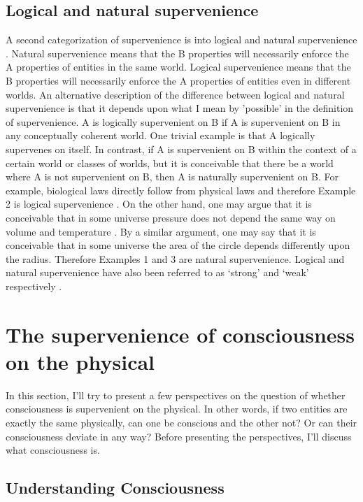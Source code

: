 \documentclass{article}
\begin{document}
\subsection*{Logical and natural supervenience}

A second categorization of supervenience is into logical and natural supervenience \cite{chalmers1996conscious}. Natural supervenience means that the  B properties will necessarily enforce the  A properties of entities in the same world. Logical supervenience means that the B properties will necessarily enforce the A properties of entities even in different worlds. An alternative description of the difference between logical and natural supervenience is that it depends upon what I mean by ’possible’ in the definition of supervenience. A is logically supervenient on B if A is supervenient on B in any conceptually coherent world. One trivial example is that A logically supervenes on itself. In contrast, if A is supervenient on B within the context of a certain world or classes of worlds, but it is conceivable that there be a world where A is not supervenient on B, then A is naturally supervenient on B. For example, biological laws directly follow from physical laws and therefore Example 2 is logical supervenience \cite{chalmers1996conscious}. On the other hand, one may argue that it is conceivable that in some universe pressure does not depend the same way on volume and temperature \cite{chalmers1996conscious}. By a similar argument, one may say that it is conceivable that in some universe the area of the circle depends differently upon the radius. Therefore Examples 1 and 3 are natural supervenience. Logical and natural supervenience have also been referred to as ‘strong’ and ‘weak’ respectively \cite{mclaughlin2018supervenience}.
 
\section*{The supervenience of consciousness on the physical}

In this section, I'll try to present a few perspectives on the question of whether consciousness is supervenient on the physical. In other words, if two entities are exactly the same physically, can one be conscious and the other not? Or can their consciousness deviate in any way? Before presenting the perspectives, I'll discuss what consciousness is.


\subsection*{Understanding Consciousness}
\end{document}
